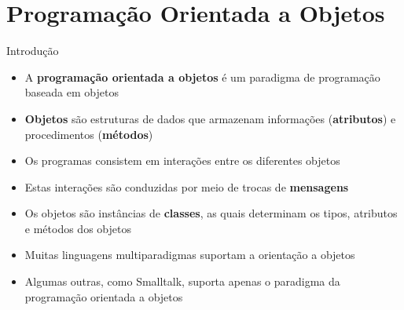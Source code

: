\section{Programação Orientada a Objetos}

\begin{frame}[fragile]{Introdução}

    \begin{itemize}
        \item A \textbf{programação orientada a objetos} é um paradigma de programação baseada em 
            objetos

        \item \textbf{Objetos} são estruturas de dados que armazenam informações 
            (\textbf{atributos}) e procedimentos (\textbf{métodos})

        \item Os programas consistem em interações entre os diferentes objetos 

        \item Estas interações são conduzidas por meio de trocas de \textbf{mensagens}

        \item Os objetos são instâncias de \textbf{classes}, as quais determinam os tipos, atributos
            e métodos dos objetos

        \item Muitas linguagens multiparadigmas suportam a orientação a objetos

        \item Algumas outras, como Smalltalk, suporta apenas o paradigma da programação orientada a
            objetos
    \end{itemize}

\end{frame}

